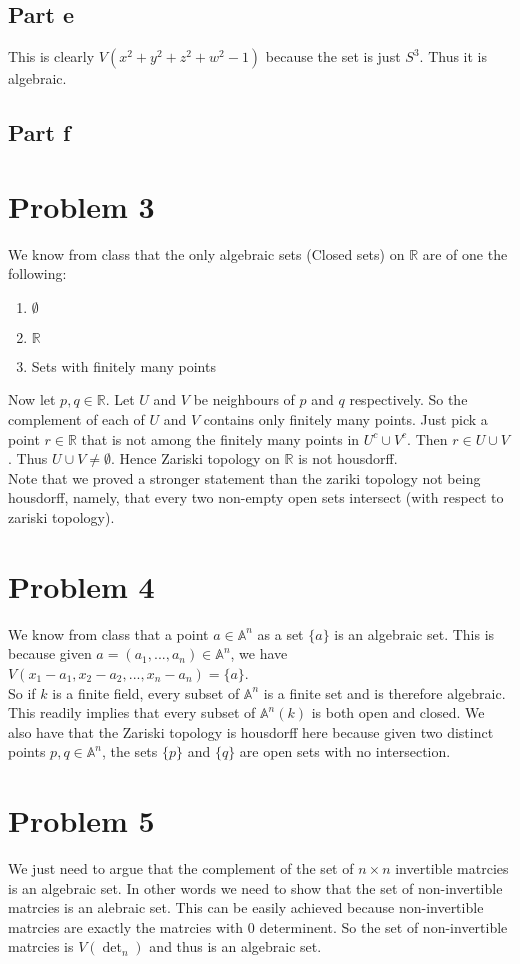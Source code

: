 \documentclass[12pt]{article}
\begin{document}
\subsection*{Part e}
This is clearly $V(x^2+y^2+z^2+w^2-1)$ because the set is just $S^3$. Thus it is algebraic.
\subsection*{Part f}


\section*{Problem 3}
We know from class that the only algebraic sets (Closed sets) on $\mathbb{R}$ are of one the following:
\begin{enumerate}
\item $\emptyset $
\item $\mathbb{R}$
\item Sets with finitely many points
\end{enumerate}
Now let $p,q \in \mathbb{R}$. 
Let $U$ and $V$ be neighbours of $p$ and $q$ respectively. So the complement of each of $U$ and $V$ contains only finitely many points. Just pick a point $r \in \mathbb{R}$ that is not among the finitely many points in $U^{c} \cup V^{c}$. Then $r \in U \cup V$.
Thus $U \cup V \not= \emptyset$.
Hence Zariski topology on $\mathbb{R}$ is not housdorff.
\\
Note that we proved a stronger statement than the zariki topology not being housdorff, namely, that every two non-empty open sets intersect (with respect to zariski topology).

\clearpage
\section*{Problem 4}
We know from class that a point $a \in \mathbb{A}^n$ as a set $\{a\}$ is an algebraic set. This is because given 
$a=(a_1,...,a_n) \in \mathbb{A}^n$, we have 
$V(x_1-a_1,x_2-a_2,...,x_n-a_n)=\{a\}$.
\\
So if $k$ is a finite field, every subset of $\mathbb{A}^n$ is a finite set and is therefore algebraic. This readily implies that every subset of $\mathbb{A}^n(k)$ is both open and closed. We also have that the Zariski topology is housdorff here because given two distinct points $p,q \in \mathbb{A}^n$, the sets $\{p\}$ and $\{q\}$ are open sets with no intersection.
\section*{Problem 5}
We just need to argue that the complement of the set of $n \times n$ invertible matrcies is an algebraic set. In other words we need to show that the set of non-invertible matrcies is an alebraic set. This can be easily achieved because non-invertible matrcies are exactly the matrcies with 0 determinent. So the set of non-invertible matrcies is $V(\det_n)$ and thus is an algebraic set.
\end{document}
